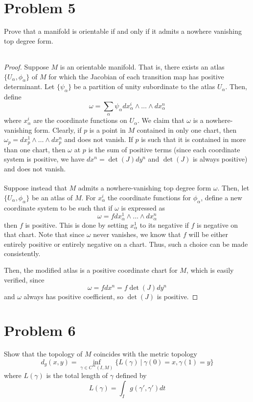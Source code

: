 \documentclass[fontsize=11pt]{scrartcl} %
\numberwithin{equation}{section} %
\numberwithin{figure}{section} %
\numberwithin{table}{section} %
\begin{document}
\section*{Problem 5}
Prove that a manifold is orientable if and only if it admits a nowhere vanishing
top degree form.
\\
\\
\begin{proof}
    Suppose $M$ is an orientable manifold. That is, there exists an atlas
    $\{U_{\alpha},\phi_{\alpha}\}$ of $M$ for which the Jacobian of each
    transition map has positive determinant. Let $\{\psi_{\alpha}\}$ be a
    partition of unity subordinate to the atlas $U_\alpha$. Then, define
    \[
        \omega = \sum_{\alpha}\psi_{\alpha}dx_{\alpha}^i\wedge\dots\wedge
        dx_{\alpha}^n
    \]
    where $x_{\alpha}^i$ are the coordinate functions on $U_\alpha$. We claim
    that $\omega$ is a nowhere-vanishing form. Clearly, if $p$ is a point in $M$
    contained in only one chart, then $\omega_p = dx_p^1\wedge\dots\wedge
    dx_p^n$ and does not vanish. If $p$ is such that it is contained in more
    than one chart, then $\omega$ at $p$ is the sum of positive terms (since
        each coordinate system is positive, we have $dx^n = \det(J)dy^n$ and
    $\det(J)$ is always positive) and does not vanish.
    \\
    \\
    Suppose instead that $M$ admits a nowhere-vanishing top degree form
    $\omega$. Then, let $\{U_{\alpha},\phi_{\alpha}\}$ be an atlas of $M$. For
    $x_{\alpha}^i$ the coordinate functions for $\phi_{\alpha}$, define a new
    coordinate system to be such that if $\omega$ is expressed as
    \[
    \omega = fdx_{\alpha}^1\wedge\dots\wedge dx_{\alpha}^n
    \]
    then $f$ is positive. This is done by setting $x_{\alpha}^1$ to its negative
    if $f$ is negative on that chart. Note that since $\omega$ never vanishes,
    we know that $f$ will be either entirely positive or entirely negative on a
    chart. Thus, such a choice can be made consistently.

    Then, the modified atlas is a positive coordinate chart for $M$, which is
    easily verified, since
    \[
    \omega = fdx^n = f\det(J)dy^n
    \]
    and $\omega$ always has positive coefficient, so $\det(J)$ is positive.
\end{proof}

\section*{Problem 6}
Show that the topology of $M$ coincides with the metric topology 
\[
    d_g(x,y) = \inf_{\gamma\in C^{\infty}(I,M)} \{L(\gamma)\ |\
    \gamma(0)=x,\gamma(1)=y\}
\]
where $L(\gamma)$ is the total length of $\gamma$ defined by
\[
    L(\gamma) = \int_Ig(\gamma',\gamma')dt
\]
\end{document}
